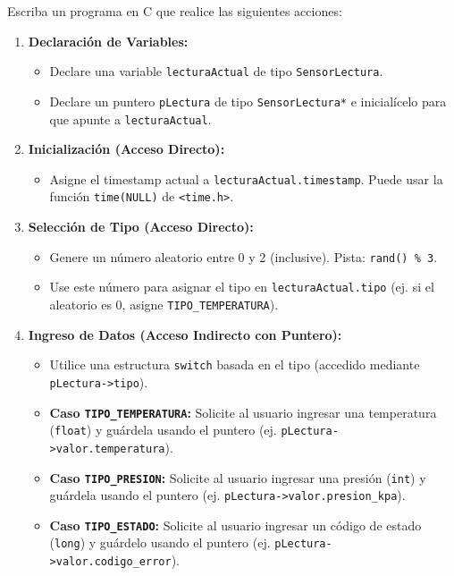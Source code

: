 Escriba un programa en C que realice las siguientes acciones:
\begin{enumerate}
    \item \textbf{Declaración de Variables:}
    \begin{itemize}
        \item Declare una variable \texttt{lecturaActual} de tipo \texttt{SensorLectura}.
        \item Declare un puntero \texttt{pLectura} de tipo \texttt{SensorLectura*} e inicialícelo para que apunte a \texttt{lecturaActual}.
    \end{itemize}

    \item \textbf{Inicialización (Acceso Directo):}
    \begin{itemize}
        \item Asigne el timestamp actual a \texttt{lecturaActual.timestamp}. Puede usar la función \texttt{time(NULL)} de \texttt{<time.h>}.
    \end{itemize}

    \item \textbf{Selección de Tipo (Acceso Directo):}
    \begin{itemize}
        \item Genere un número aleatorio entre 0 y 2 (inclusive). Pista: \texttt{rand() \% 3}.
        \item Use este número para asignar el tipo en \texttt{lecturaActual.tipo} (ej. si el aleatorio es 0, asigne \texttt{TIPO\_TEMPERATURA}).
    \end{itemize}

    \item \textbf{Ingreso de Datos (Acceso Indirecto con Puntero):}
    \begin{itemize}
        \item Utilice una estructura \texttt{switch} basada en el tipo (accedido mediante \texttt{pLectura->tipo}).
        \item \textbf{Caso \texttt{TIPO\_TEMPERATURA}:} Solicite al usuario ingresar una temperatura (\texttt{float}) y guárdela usando el puntero (ej. \texttt{pLectura->valor.temperatura}).
        \item \textbf{Caso \texttt{TIPO\_PRESION}:} Solicite al usuario ingresar una presión (\texttt{int}) y guárdela usando el puntero (ej. \texttt{pLectura->valor.presion\_kpa}).
        \item \textbf{Caso \texttt{TIPO\_ESTADO}:} Solicite al usuario ingresar un código de estado (\texttt{long}) y guárdelo usando el puntero (ej. \texttt{pLectura->valor.codigo\_error}).
    \end{itemize}


\end{enumerate}

